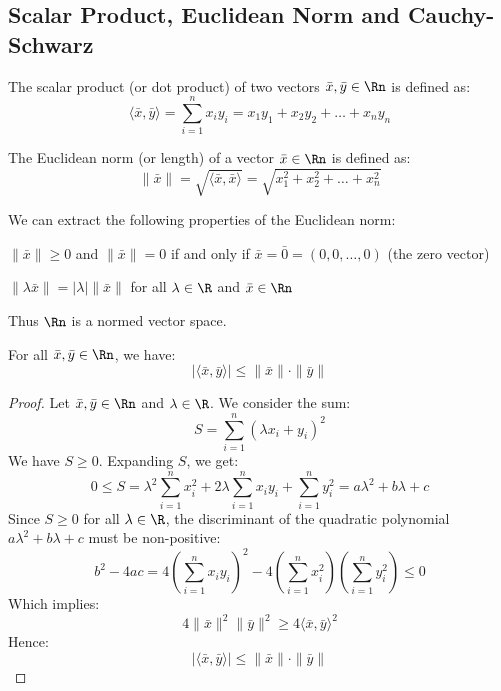\subsection{Scalar Product, Euclidean Norm and Cauchy-Schwarz}
\begin{definition}
    The scalar product (or dot product) of two vectors $\bar{x}, \bar{y} \in \Rn$ is defined as:
    \[
        \langle \bar{x}, \bar{y} \rangle = \sum_{i=1}^n x_i y_i = x_1 y_1 + x_2 y_2 + \ldots + x_n y_n
    \]
\end{definition}

\begin{definition}
    The Euclidean norm (or length) of a vector $\bar{x} \in \Rn$ is defined as:
    \[
        \|\bar{x}\| = \sqrt{\langle \bar{x}, \bar{x} \rangle} = \sqrt{x_1^2 + x_2^2 + \ldots + x_n^2}
    \]
\end{definition}
We can extract the following properties of the Euclidean norm:
\begin{citemize}
    \item $\|\bar{x} \| \geq 0$ and $\|\bar{x} \| = 0$ if and only if $\bar{x} = \bar{0} = (0, 0, \ldots, 0)$ (the zero vector)
    \item $\|\lambda \bar{x} \| = |\lambda| \|\bar{x} \|$ for all $\lambda \in \R$ and $\bar{x} \in \Rn$
\end{citemize}
Thus $\Rn$ is a normed vector space.

\begin{theorem}
    For all $\bar{x}, \bar{y} \in \Rn$, we have:
    \[
        |\langle \bar{x}, \bar{y} \rangle| \leq \|\bar{x}\| \cdot \|\bar{y}\|
    \]
\end{theorem}
\begin{proof}
    Let $\bar{x}, \bar{y} \in \Rn$ and $\lambda \in \R$. We consider the sum:
    \[
        S = \sum_{i=1}^n (\lambda x_i + y_i)^2
    \]
    We have $S \geq 0$. Expanding $S$, we get:
    \[
        0 \leq S = \lambda^2 \sum_{i=1}^n x_i^2 + 2\lambda \sum_{i=1}^n x_i y_i + \sum_{i=1}^n y_i^2 = a\lambda^2 + b\lambda + c
    \]
    Since $S \geq 0$ for all $\lambda \in \R$, the discriminant of the quadratic polynomial $a\lambda^2 + b\lambda + c$ must be non-positive:
    \[
        b^2 - 4ac = 4 \left(\sum_{i = 1}^{n} x_i y_i\right)^2 - 4 \left(\sum_{i = 1}^{n} x_i^2\right) \left(\sum_{i = 1}^{n} y_i^2\right) \leq 0
    \]
    Which implies:
    \[
        4 \|\bar{x}\|^2 \|\bar{y}\|^2 \geq 4 \langle \bar{x}, \bar{y} \rangle^2
    \]
    Hence:
    \[
        |\langle \bar{x}, \bar{y} \rangle| \leq \|\bar{x}\| \cdot \|\bar{y}\|
    \]
\end{proof}

